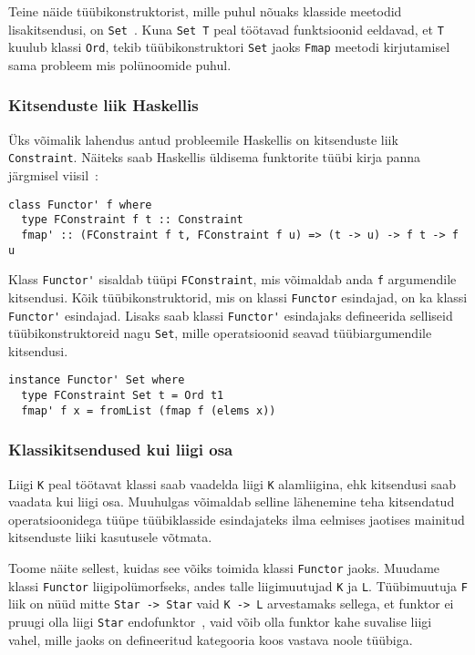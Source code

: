 \documentclass[12pt]{article}
\begin{document}
      Teine näide tüübikonstruktorist, mille puhul nõuaks klasside meetodid lisakitsendusi, on \verb!Set!~\cite{Cat}. Kuna \verb!Set T! peal töötavad funktsioonid eeldavad, et \verb!T! kuulub klassi \verb!Ord!, tekib tüübikonstruktori \verb!Set! jaoks \verb!Fmap! meetodi kirjutamisel sama probleem mis polünoomide puhul.
      \subsubsection{Kitsenduste liik Haskellis}
        Üks võimalik lahendus antud probleemile Haskellis on kitsenduste liik \verb!Constraint!. Näiteks saab Haskellis üldisema funktorite tüübi kirja panna järgmisel viisil~\cite{Cat}:

        \begin{verbatim}class Functor' f where
  type FConstraint f t :: Constraint
  fmap' :: (FConstraint f t, FConstraint f u) => (t -> u) -> f t -> f u\end{verbatim}

        Klass \verb!Functor'! sisaldab tüüpi \verb!FConstraint!, mis võimaldab anda \verb!f! argumendile kitsendusi. Kõik tüübikonstruktorid, mis on klassi \verb!Functor! esindajad, on ka klassi \verb!Functor'! esindajad. Lisaks saab klassi \verb!Functor'! esindajaks defineerida selliseid tüübikonstruktoreid nagu \verb!Set!, mille operatsioonid seavad tüübiargumendile kitsendusi.

        \begin{verbatim}instance Functor' Set where
  type FConstraint Set t = Ord t1
  fmap' f x = fromList (fmap f (elems x))\end{verbatim}
      \subsubsection{Klassikitsendused kui liigi osa}
        Liigi \verb!K! peal töötavat klassi saab vaadelda liigi \verb!K! alamliigina, ehk kitsendusi saab vaadata kui liigi osa. Muuhulgas võimaldab selline lähenemine teha kitsendatud operatsioonidega tüüpe tüübiklasside esindajateks ilma eelmises jaotises mainitud kitsenduste liiki kasutusele võtmata.

        Toome näite sellest, kuidas see võiks toimida klassi \verb!Functor! jaoks. Muudame klassi \verb!Functor! liigipolümorfseks, andes talle liigimuutujad \verb!K! ja \verb!L!. Tüübimuutuja \verb!F! liik on nüüd mitte \verb!Star -> Star! vaid \verb!K -> L! arvestamaks sellega, et funktor ei pruugi olla liigi \verb!Star! endofunktor~\cite{Cat}, vaid võib olla funktor kahe suvalise liigi vahel, mille jaoks on defineeritud kategooria koos vastava noole tüübiga.
\end{document}
